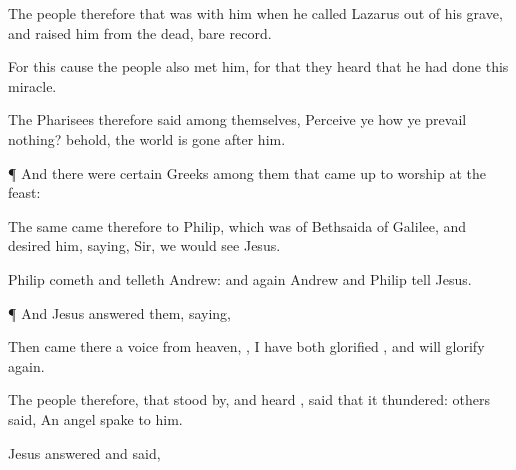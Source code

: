 {The
people
therefore that
was
with
him
when he
called
Lazarus out
of his
grave,
and
raised
him
from the
dead, bare
record.

For
this
cause the
people
also
met
him, for
that they heard
that
he had
done
this
miracle.

The
Pharisees
therefore
said
among
themselves, Perceive
ye
how ye prevail
nothing?
behold, the
world is
gone
after
him.


\par }{\PP {}¶
And there
were
certain
Greeks
among them that came
up to
worship
at the
feast:

The
same
came
therefore to
Philip, which was
of
Bethsaida of
Galilee,
and
desired
him,
saying,
Sir, we
would
see
Jesus.

Philip
cometh
and
telleth
Andrew:
and
again
Andrew
and
Philip
tell
Jesus.


\par }{\PP {}¶
And
Jesus
answered
them,
saying,
{}





Then came
there a
voice
from
heaven,
{}, I
have
both
glorified
{},
and will
glorify
{}
again.

The
people
therefore, that stood
by,
and
heard
{}, said
that
it
thundered:
others
said, An
angel
spake to
him.

Jesus
answered
and
said,
{}



}

